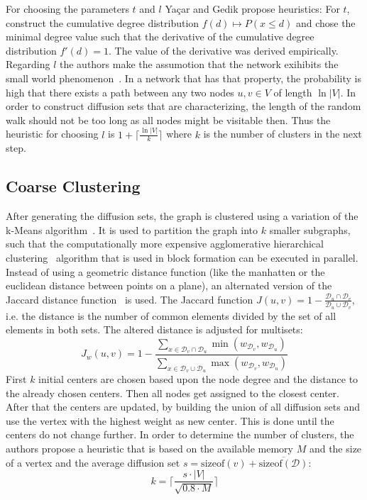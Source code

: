     For choosing the parameters $t$ and $l$ Ya\c{c}ar and Gedik propose heuristics: 
    For $t$, construct the cumulative degree distribution $f(d) \mapsto P(x \leq d)$ and chose the minimal degree value such that the derivative of the cumulative degree distribution $f'(d) = 1$. The value of the derivative was derived empirically.
    Regarding $l$ the authors make the assumotion that the network exihibits the small world phenomenon~\autocite{kleinberg2000small}.
    In a network that has that property, the probability is high that there exists a path between any two nodes $u,v \in V$ of length $\ln{|V|}$.
    In order to construct diffusion sets that are characterizing, the length of the random walk should not be too long as all nodes might be visitable then. Thus the heuristic for choosing $l$ is $1 + \lceil \frac{\ln |V|}{k} \rceil$ where $k$ is the number of clusters in the next step.
    
    \subsection*{Coarse Clustering}
    After generating the diffusion sets, the graph is clustered using a variation of the k-Means algorithm~\autocite{lloyd1982least}. 
    It is used to partition the graph into $k$ smaller subgraphs, such that the computationally more expensive agglomerative hierarchical clustering~\autocite{hac} algorithm that is used in block formation can be executed in parallel.
    Instead of using a geometric distance function (like the manhatten or the euclidean distance between points on a plane), an alternated version of the Jaccard distance function~\autocite{jaccard1912distribution} is used. 
    The Jaccard function $J(u, v) = 1 - \frac{\mathcal{D}_u \cap \mathcal{D}_v}{\mathcal{D}_u \cup \mathcal{D}_v}$, i.e. the distance is the number of common elements divided by the set of all elements in both sets. 
    The altered distance is adjusted for multisets:  
    \[J_w (u, v) = 1 - \frac{\sum_{x \in \mathcal{D}_v \cap \mathcal{D}_u} \min (w_{\mathcal{D}_v}, w_{\mathcal{D}_u})}{\sum_{x \in \mathcal{D}_v \cup \mathcal{D}_u} \max (w_{\mathcal{D}_v}, w_{\mathcal{D}_u})} \]
    First $k$ initial centers are chosen based upon the node degree and the distance to the already chosen centers.
    Then all nodes get assigned to the closest center. 
    After that the centers are updated, by building the union of all diffusion sets and use the vertex with the highest weight as new center.
    This is done until the centers do not change further.
    In order to determine the number of clusters, the authors propose a heuristic that is based on the available memory $M$ and the size of a vertex and the average diffusion set $s = \text{sizeof}(v) + \overline{\text{sizeof}(\mathcal{D})}$: 
    \[ k = \lceil \frac{s \cdot |V|}{\sqrt{0.8 \cdot M}} \rceil \]
    
